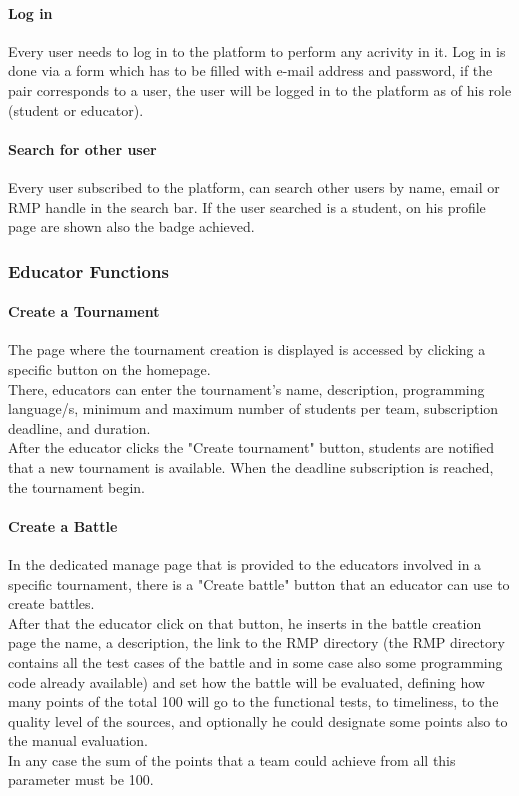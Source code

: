 \paragraph{Log in}
Every user needs to log in to the platform to perform any acrivity in it. Log in is done via a form which has to be filled with e-mail address and password, if the pair corresponds to a user, the user will be logged in to the platform as of his role (student or educator).
\paragraph{Search for other user}
Every user subscribed to the platform, can search other users by name, email or RMP handle in the search bar. If the user searched is a student, on his profile page are shown also the badge achieved.

\subsubsection{Educator Functions}

\paragraph{Create a Tournament}
The page where the tournament creation is displayed is accessed by clicking a specific button on the homepage.\\
There, educators can enter the tournament's name, description, programming language/s, minimum and maximum number of students per team, subscription deadline, and duration.\\ 
After the educator clicks the "Create tournament" button, students are notified that a new tournament is available.
When the deadline subscription is reached, the tournament begin.

\paragraph{Create a Battle}
In the dedicated manage page that is provided to the educators involved in a specific tournament, there is a "Create battle" button that an educator can use to create battles.\\
After that the educator click on that button, he inserts in the battle creation page the name, a description, the link to the RMP directory (the RMP directory contains all the test cases of the battle
and in some case also some programming code already available) and set how the battle will be evaluated, defining how many points of the total 100 will go to the functional tests, to timeliness, to 
the quality level of the sources, and optionally he could designate some points also to the manual evaluation.\\
In any case the sum of the points that a team could achieve from all this parameter must be 100.

